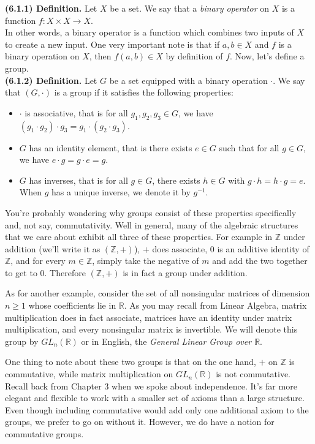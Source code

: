 \documentclass[12pt]{book}
\def\R{{\mathbb{R}}}
\def\Z{{\mathbb{Z}}}
\def\header #1{\noindent\textbf{#1}}
\begin{document}
\header{(6.1.1) Definition.} Let $X$ be a set. We say that a \textit{binary operator} on $X$ is a function $f\colon X\times X\rightarrow X$. \\

In other words, a binary operator is a function which combines two inputs of $X$ to create a new input. One very important note is that if $a,b\in X$ and $f$ is a binary operation on $X$, then $f(a,b)\in X$ by definition of $f$. Now, let's define a group.\\

\header{(6.1.2) Definition.} Let $G$ be a set equipped with a binary operation $\cdot$. We say that $(G,\cdot)$ is a group if it satisfies the following properties:
\begin{itemize}
\item $\cdot$ is associative, that is for all $g_1,g_2,g_3\in G$, we have $(g_1\cdot g_2)\cdot g_3 = g_1\cdot (g_2\cdot g_3)$.
\item $G$ has an identity element, that is there exists $e\in G$ such that for all $g\in G$, we have $e\cdot g=g\cdot e=g$.
\item $G$ has inverses, that is for all $g\in G$, there exists $h\in G$ with $g\cdot h=h\cdot g=e$. When $g$ has a unique inverse, we denote it by $g^{-1}$.
\end{itemize}

You're probably wondering why groups consist of these properties specifically and, not say, commutativity. Well in general, many of the algebraic structures that we care about exhibit all three of these properties. For example in $\Z$ under addition (we'll write it as $(\Z,+)$), $+$ does associate, 0 is an additive identity of $\Z$, and for every $m\in\Z$, simply take the negative of $m$ and add the two together to get to 0. Therefore $(\Z,+)$ is in fact a group under addition. 

As for another example, consider the set of all nonsingular matrices of dimension $n\geq 1$ whose coefficients lie in $\R$. As you may recall from Linear Algebra, matrix multiplication does in fact associate, matrices have an identity under matrix multiplication, and every nonsingular matrix is invertible. We will denote this group by $GL_n(\R)$ or in English, the \textit{General Linear Group over $\R$}.

One thing to note about these two groups is that on the one hand, $+$ on $\Z$ is commutative, while matrix multiplication on $GL_n(\R)$ is not commutative. Recall back from Chapter 3 when we spoke about independence. It's far more elegant and flexible to work with a smaller set of axioms than a large structure. Even though including commutative would add only one additional axiom to the groups, we prefer to go on without it. However, we do have a notion for commutative groups.\\
\end{document}
